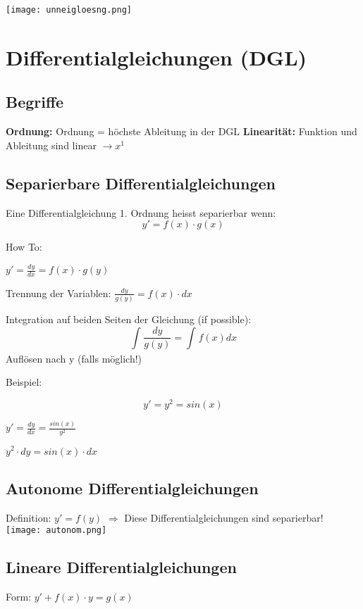 \begin{multicols*}{3}
    \texttt{[image: unneigloesng.png]}

    \section{Differentialgleichungen (DGL)}
    \subsection{Begriffe}
    {\textbf{Ordnung:} Ordnung = höchste Ableitung in der DGL}
    {\textbf{Linearität:} Funktion und Ableitung sind linear $\rightarrow x^1$ }

    \subsection{Separierbare Differentialgleichungen}
    {Eine Differentialgleichung 1. Ordnung heisst separierbar wenn:}
    $$ y' = f(x)\cdot g(x)$$

    {How To:}

    $y' = \frac{dy}{dx} = f(x)\cdot g(y) $

     {Trennung der Variablen:} $\frac{dy}{g(y)} = f(x)\cdot dx$

     {Integration auf beiden Seiten der Gleichung (if possible):} $$\int_{}^{}{\frac{dy}{g(y)}=\int_{}^{}f(x)dx}$$
     {Auflösen nach y (falls möglich!)}

    \begin{multicols}{2}
        {Beispiel:}

        $$y' = y^2 = sin(x)$$

         $y' = \frac{dy}{dx}=\frac{sin(x)}{y^2}$

         $y^2\cdot dy = sin(x)\cdot dx $
        \columnbreak



    \end{multicols}



    \subsection{Autonome Differentialgleichungen}
    {Definition: $y' = f(y)$}
    {$\Rightarrow$ Diese Differentialgleichungen sind separierbar!}
    \texttt{[image: autonom.png]}

    \subsection{ Lineare Differentialgleichungen}
    {\large Form: $y' + f(x) \cdot y = g(x)$}


\end{multicols*}
